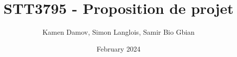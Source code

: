 \documentclass{article}
\title{STT3795 - Proposition de projet}
\author{Kamen Damov, Simon Langlois, Samir Bio Gbian}
\date{February 2024}
\begin{document}
\maketitle
\begin{comment}
\section{Descriptions et objectifs}
L'objectif de ce projet est de comparer différentes pipelines d'apprentissage automatique pour classifier des langages, des types de musique, et des chiffres prononcés. Notre projet sera une analyse empirique des différentes architecture de classification. Nous allons en développer trois pipelines qui auront des prétraitement de données différents et classificateurs différents:
\subsection{}
La première architecture serait d'utiliser une pipeline de prétraitement de données audios soit avec un Fourier Transform à partir duquel on pourra extraire les domaines fréquentiels, et domaines temporels. Suite à cela, nous appliquerons des modèles de classifications traditionnels tel que le SVM, l'arbre de décision, la forêt d'arbres de décisions, et la Naive de Bayes. Finalement, nous allons évaluer la performance des modèles. 
\subsection{}
La deuxième architecture est d'appliquer la même pipeline de prétraitement qu'au point 1.1 mais auquel on ajoutera un algorithme de d'analyse de données topologiques nommées persistent homology qui nous donnera des caractéristiques additonnelles. Nous nous sommes inspiré de ce papier-là qui présente une méthode d'analyse topologique pour but de classification \url{https://arxiv.org/abs/1910.08345}. Suite à ce prétraitement, nous allons utiliser les mêmes classificateurs qu'au point 1.1.
\subsection{}
La troisième architecture sera d'appliquer la même pipeline que le point 2.1 mais d'appliquer un modèle d'apprentissage profond soit un réseaux de neurones convolutionnel (CNN).\\\\
Nous allons utiliser ces trois pipelines sur trois jeux de données audios différents ce qui nous donnera la possibilité de comparer les types d'architectures entre elles, mais aussi de comparer un type d'architecture sur 3 jeux de données différents. 

\end{comment}
\end{document}
